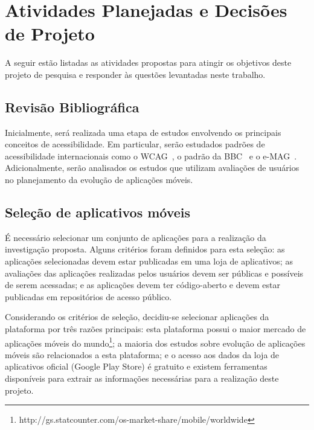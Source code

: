
\section{Atividades Planejadas e Decisões de Projeto}
\label{sec:atividadesgerais}

A seguir estão listadas as atividades propostas para atingir os objetivos deste projeto de pesquisa e responder às questões levantadas neste trabalho.

\subsection{Revisão Bibliográfica}

Inicialmente, será realizada uma etapa de estudos envolvendo os principais conceitos de acessibilidade. Em particular, serão estudados padrões de acessibilidade internacionais como o WCAG~\cite{wcag}, o padrão da BBC~\cite{bbc} e o e-MAG~\cite{emag}. Adicionalmente, serão analisados os estudos que utilizam avaliações de usuários no planejamento da evolução de aplicações móveis.

\subsection{Seleção de aplicativos móveis}
\label{sec:selecaoapps}

É necessário selecionar um conjunto de aplicações para a realização da investigação proposta. Alguns critérios foram definidos para esta seleção: as aplicações selecionadas devem estar publicadas em uma loja de aplicativos; as avaliações das aplicações realizadas pelos usuários devem ser públicas e possíveis de serem acessadas; e as aplicações devem ter código-aberto e devem estar publicadas em repositórios de acesso público.

Considerando os critérios de seleção, decidiu-se selecionar aplicações da plataforma por três razões principais: 
esta plataforma possui o maior mercado de aplicações móveis do mundo\footnote{http://gs.statcounter.com/os-market-share/mobile/worldwide}; 
a maioria dos estudos sobre evolução de aplicações móveis são relacionados a esta plataforma; 
e o acesso aos dados da loja de aplicativos oficial (Google Play Store) é gratuito e existem ferramentas disponíveis para extrair as informações necessárias para a realização deste projeto. 


